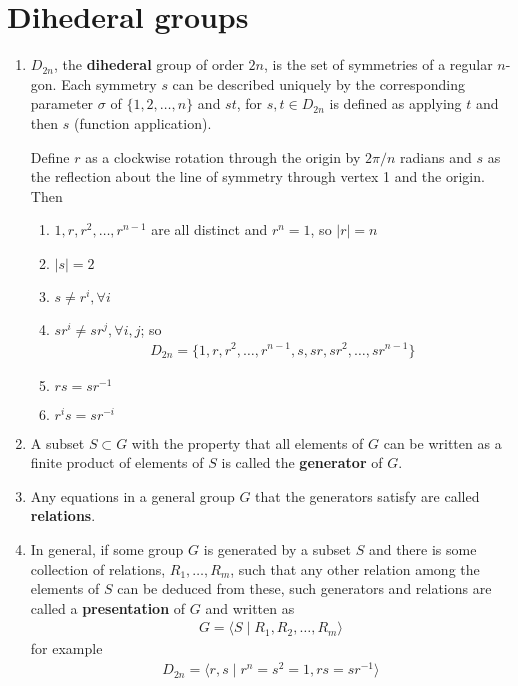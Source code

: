 \documentclass[titlepage, 12pt]{article}
\begin{document}
\section{Dihederal groups}

\begin{enumerate}

  \item $D_{2n}$, the \textbf{dihederal} group of order $2n$, is the set of
    symmetries of a regular $n$-gon. Each symmetry $s$ can be described uniquely
    by the corresponding parameter $\sigma$ of $\{1,2,\dots,n\}$ and $st$, for
    $s, t\in D_{2n}$ is defined as applying $t$ and then $s$ (function
    application).

    Define $r$ as a clockwise rotation through the origin by $2\pi/n$ radians
    and $s$ as the reflection about the line of symmetry through vertex 1 and
    the origin. Then

    \begin{enumerate}

      \item $1,r,r^2,\dots,r^{n-1}$ are all distinct and $r^n=1$, so $|r| = n$

      \item $|s| = 2$

      \item $s\neq r^i,\forall i$

      \item $sr^i\neq sr^j, \forall i, j$; so
        \begin{gather*}
          D_{2n} = \{1,r,r^2,\dots,r^{n-1},s,sr,sr^2,\dots,sr^{n-1}\}
        \end{gather*}

      \item $rs=sr^{-1}$

      \item $r^is=sr^{-i}$

    \end{enumerate}

  \item A subset $S\subset G$ with the property that all elements of $G$ can be
    written as a finite product of elements of $S$ is called the
    \textbf{generator} of $G$.

  \item Any equations in a general group $G$ that the generators satisfy are
    called \textbf{relations}.

  \item In general, if some group $G$ is generated by a subset $S$ and there is
    some collection of relations, $R_1,\dots,R_m$, such that any other relation
    among the elements of $S$ can be deduced from these, such generators and
    relations are called a \textbf{presentation} of $G$ and written as
    \begin{gather*}
      G = \langle S\mid R_1, R_2,\dots, R_m\rangle
    \end{gather*}
    for example
    \begin{gather*}
      D_{2n} = \langle r, s\mid r^n = s^2 = 1, rs = sr^{-1}\rangle
    \end{gather*}

\end{enumerate}
\end{document}
